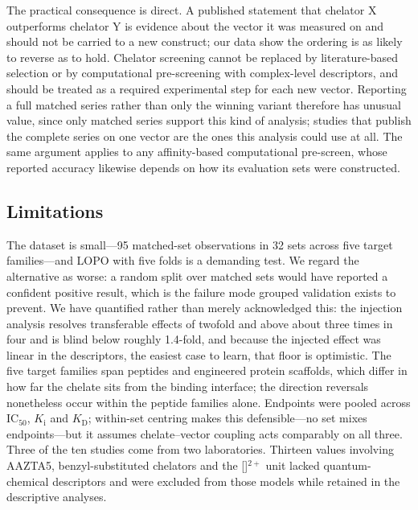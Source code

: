 \documentclass[twoside,twocolumn,9pt]{article}
\begin{document}
The practical consequence is direct. A published statement that chelator X outperforms chelator Y is evidence about the vector it was measured on and should not be carried to a new construct; our data show the ordering is as likely to reverse as to hold. Chelator screening cannot be replaced by literature-based selection or by computational pre-screening with complex-level descriptors, and should be treated as a required experimental step for each new vector. Reporting a full matched series rather than only the winning variant therefore has unusual value, since only matched series support this kind of analysis; studies that publish the complete series on one vector\cite{Kim2026PbSSTR2,Guenther2022,Abouzayed2023} are the ones this analysis could use at all. The same argument applies to any affinity-based computational pre-screen, whose reported accuracy likewise depends on how its evaluation sets were constructed.\cite{Kang2026Docking,Kang2026GasBench}

\subsection{Limitations}

The dataset is small---95 matched-set observations in 32 sets across five target families---and LOPO with five folds is a demanding test. We regard the alternative as worse: a random split over matched sets would have reported a confident positive result, which is the failure mode grouped validation exists to prevent.\cite{Kim2026TAS2R,Boldini2025UMAP} We have quantified rather than merely acknowledged this: the injection analysis resolves transferable effects of twofold and above about three times in four and is blind below roughly 1.4-fold, and because the injected effect was linear in the descriptors, the easiest case to learn, that floor is optimistic. The five target families span peptides and engineered protein scaffolds, which differ in how far the chelate sits from the binding interface; the direction reversals nonetheless occur within the peptide families alone. Endpoints were pooled across IC$_{50}$, $K_\text{i}$ and $K_\text{D}$; within-set centring makes this defensible---no set mixes endpoints---but it assumes chelate--vector coupling acts comparably on all three. Three of the ten studies come from two laboratories. Thirteen values involving AAZTA5, benzyl-substituted chelators and the []$^{2+}$ unit lacked quantum-chemical descriptors and were excluded from those models while retained in the descriptive analyses.
\end{document}
